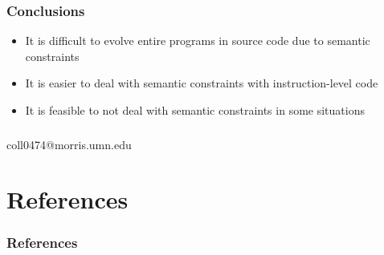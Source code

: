 \documentclass{beamer}
\newcommand{\linespace}{\vskip 0.25cm}
\begin{document}
\begin{frame}
\frametitle{Conclusions}
\begin{itemize}
\item It is difficult to evolve entire programs in source code due to semantic constraints
\item It is easier to deal with semantic constraints with instruction-level code
\item It is feasible to not deal with semantic constraints in some situations

\end{itemize}

\end{frame}


\begin{frame}
\frametitle{}
{
\cite{FINCH:2011}
\cite{Assembly:2010}
}
\begin{center}
coll0474@morris.umn.edu
\\
\linespace
\linespace
{}
\end{center}

\end{frame}




\section*{References}

\begin{frame} 
	\frametitle{References} 
	
	
\end{frame} 
\end{document}
